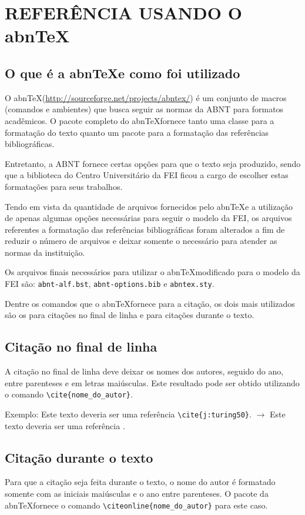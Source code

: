 \chapter{REFERÊNCIA USANDO O abn\TeX}\label{chap:referencia}

    \section{O que é a abn\TeX e como foi utilizado}

    O abn\TeX (\href{http://sourceforge.net/projects/abntex/}{http://sourceforge.net/projects/abntex/}) é um conjunto de macros (comandos e ambientes) que busca seguir as normas da ABNT para formatos acadêmicos. O pacote completo do abn\TeX fornece tanto uma classe para a formatação do texto quanto um pacote para a formatação das referências bibliográficas.

    Entretanto, a ABNT fornece certas opções para que o texto seja produzido, sendo que a biblioteca do Centro Universitário da FEI ficou a cargo de escolher estas formatações para seus trabalhos.

    Tendo em vista da quantidade de arquivos fornecidos pelo abn\TeX e a utilização de apenas algumas opções necessárias para seguir o modelo da FEI, os arquivos referentes a formatação das referências bibliográficas foram alterados a fim de reduzir o número de arquivos e deixar somente o necessário para atender as normas da instituição.

    Os arquivos finais necessários para utilizar o abn\TeX modificado para o modelo da FEI são: \texttt{abnt-alf.bst}, \texttt{abnt-options.bib} e \texttt{abntex.sty}.

    Dentre os comandos que o abn\TeX fornece para a citação, os dois mais utilizados são os para citações no final de linha e para citações durante o texto.

    \section{Citação no final de linha}
    A citação no final de linha deve deixar os nomes dos autores, seguido do ano, entre parenteses e em letras maiúsculas. Este resultado pode ser obtido utilizando o comando \verb+\cite{nome_do_autor}+.

    Exemplo: Este texto deveria ser uma referência \verb+\cite{j:turing50}+. $\to$ Este texto deveria ser uma referência \cite{j:turing50}.

    \section{Citação durante o texto}
    Para que a citação seja feita durante o texto, o nome do autor é formatado somente com as iniciais maiúsculas e o ano entre parenteses. O pacote da abn\TeX fornece o comando \verb+\citeonline{nome_do_autor}+ para este caso.

